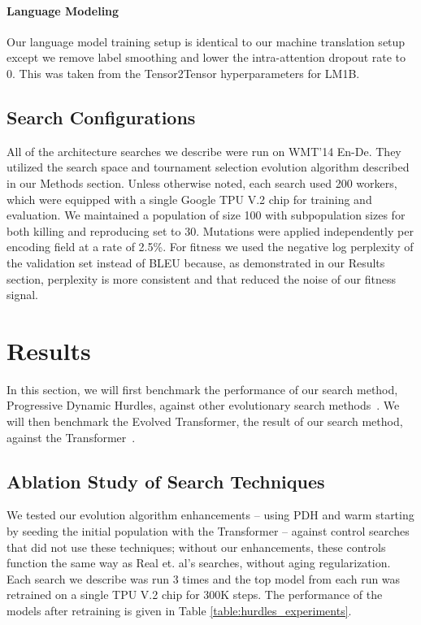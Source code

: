 \documentclass{article}
\begin{document}
\paragraph{Language Modeling}
Our language model training setup is identical to our machine translation setup except we remove label smoothing and lower the intra-attention dropout rate to 0. This was taken from the Tensor2Tensor hyperparameters for LM1B\footnotemark[2].


\subsection{Search Configurations}
All of the architecture searches we describe were run on WMT'14 En-De. They utilized the search space and tournament selection evolution algorithm described in our Methods section. Unless otherwise noted, each search used 200 workers, which were equipped with a single Google TPU V.2 chip for training and evaluation. We maintained a population of size 100 with subpopulation sizes for both killing and reproducing set to 30. Mutations were applied independently per encoding field at a rate of 2.5\%. For fitness we used the negative log perplexity of the validation set instead of BLEU because, as demonstrated in our Results section, perplexity is more consistent and that reduced the noise of our fitness signal.


\section{Results}
In this section, we will first benchmark the performance of our search method, Progressive Dynamic Hurdles, against other evolutionary search methods~\cite{real17,real19}. We will then benchmark the Evolved Transformer, the result of our search method, against the Transformer~\cite{vaswani17}.  

\subsection{Ablation Study of Search Techniques}

We tested our evolution algorithm enhancements -- using PDH and warm starting by seeding the initial population with the Transformer -- against control searches that did not use these techniques; without our enhancements, these controls function the same way as Real et. al's  searches, without aging regularization. Each search we describe was run 3 times and the top model from each run was retrained on a single TPU V.2 chip for 300K steps. The performance of the models after retraining is given in Table \ref{table:hurdles_experiments}.
\end{document}
